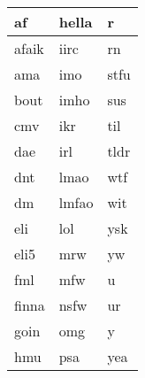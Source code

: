 \begin{tabular}{|l|l|l|} \hline
af & hella & r \\ \hline
afaik & iirc & rn \\ \hline
ama & imo & stfu \\ \hline
bout & imho & sus \\ \hline
cmv & ikr & til \\ \hline
dae & irl & tldr \\ \hline
dnt & lmao & wtf \\ \hline
dm & lmfao & wit \\ \hline
eli & lol & ysk \\ \hline
eli5 & mrw & yw \\ \hline
fml & mfw & u \\ \hline
finna & nsfw & ur \\ \hline
goin & omg & y \\ \hline
hmu & psa & yea \\ \hline
\end{tabular}